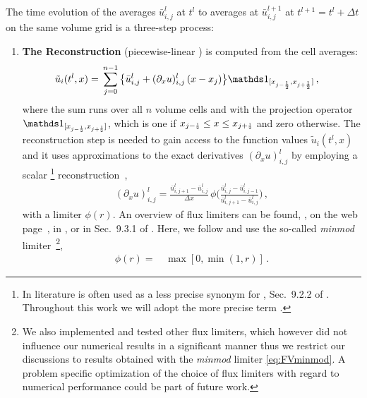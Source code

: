 The time evolution of the averages $\bar{u}_{i,j}^l$ at $t^l$ to averages at $\bar{u}_{i,j}^{l+1}$ at $t^{l+1}=t^l+\Delta t$ on the same volume grid is a three-step process:
\begin{enumerate}[label=\textbf{\arabic*}.]
	\item \textbf{The Reconstruction} (piecewise-linear \muscl{}) is computed from the cell averages:
	\begin{align}
		 \tilde{u}_i ( t^l, x ) &= \, \sum_{j=0}^{n-1} \big\{ \bar{u}_{i,j}^l + (\partial_x u )_{i,j}^l \, ( x - x_j ) \big\} \Id_{[ x_{j - \frac{1}{2}}, x_{j + \frac{1}{2}} ]} \, ,	\label{eq:FVmuscl}
	\end{align}
	where the sum runs over all $n$ volume cells and with the projection operator $ \Id_{[ x_{j - \ttfrac{1}{2}}, x_{j + \ttfrac{1}{2}} ]} $, which is one if $x_{j - \ttfrac{1}{2}}\le x \le x_{j + \ttfrac{1}{2}}$ and zero otherwise.
	The reconstruction step is needed to gain access to the function values $\tilde{u}_i ( t^l, x )$ and it uses approximations to the exact derivatives $( \partial_x u )_{i,j}^l$ by employing a scalar \footnote{%
		In literature \tvd{} is often used as a less precise synonym for , \cf{} Sec.~9.2.2 of .
		Throughout this work we will adopt the more precise term \tvni{}.
	} reconstruction~\cite{LeVeque:1992,LeVeque:2002,HARTEN1983357},
	\begin{align}
		( \partial_x u )_{i,j}^l = \frac{\bar{u}_{i,j+1}^l - \bar{u}_{i,j}^l}{\Delta x} \, \phi \bigg( \frac{\bar{u}_{i,j}^l - \bar{u}_{i,j-1}^l}{\bar{u}_{i,j+1}^l - \bar{u}_{i,j}^l} \bigg) \, ,	\label{eq:FVuxjn}
	\end{align}
	with a \tvni{} limiter $\phi(r)$. An overview of \tvni{} flux limiters can be found, \eg{}, on the web page~\cite{wikiFluxLimiter}, in , or in Sec.~9.3.1 of .
	Here, we follow  and use the so-called \textit{minmod} limiter~\cite{MinModRoe}\footnote{%
		We also implemented and tested other flux limiters, which however did not influence our numerical results in a significant manner \dash{} thus we restrict our discussions to results obtained with the \textit{minmod} limiter \eqref{eq:FVminmod}.
		A problem specific optimization of the choice of flux limiters with regard to numerical performance could be part of future work.%
	},
	\begin{align}
		\phi ( r ) = \, & \max[ 0, \min( 1, r )] \, .	\label{eq:FVminmod}
	\end{align}

\end{enumerate}
